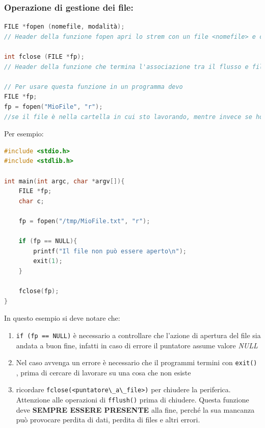 \documentclass[
  paper=a4,
  oneside  ,captions=tableheading
]{scrbook}
\newcommand{\passthrough}[1]{#1}
\begin{document}
\hypertarget{operazione-di-gestione-dei-file}{%
\subsubsection{Operazione di gestione dei
file:}\label{operazione-di-gestione-dei-file}}

\begin{lstlisting}[language=C]
FILE *fopen (nomefile, modalità);
// Header della funzione fopen apri lo strem con un file <nomefile> e con modalità (vedi dopo)

int fclose (FILE *fp);
// Header della funzione che termina l'associazione tra il flusso e file di una periferica

// Per usare questa funzione in un programma devo
FILE *fp;
fp = fopen("MioFile", "r"); 
//se il file è nella cartella in cui sto lavorando, mentre invece se ho bisogno di un file in un altra posizione devo selezionare tutto il percorso del file
\end{lstlisting}

Per esempio:

\begin{lstlisting}[language=C]
#include <stdio.h>
#include <stdlib.h>

int main(int argc, char *argv[]){
    FILE *fp;
    char c;
    
    fp = fopen("/tmp/MioFile.txt", "r");
    
    if (fp == NULL){
        printf("Il file non può essere aperto\n");
        exit(1);
    }
    
    fclose(fp);
}
\end{lstlisting}

In questo esempio si deve notare che:

\begin{enumerate}
\def\labelenumi{\arabic{enumi}.}
\item
  \passthrough{\lstinline!if (fp == NULL)!} è necessario a controllare
  che l'azione di apertura del file sia andata a buon fine, infatti in
  caso di errore il puntatore assume valore \emph{NULL}
\item
  Nel caso avvenga un errore è necessario che il programmi termini con
  \passthrough{\lstinline!exit()!} , prima di cercare di lavorare su una
  cosa che non esiste
\item
  ricordare \passthrough{\lstinline!fclose(<puntatore\_a\_file>)!} per
  chiudere la periferica. Attenzione alle operazioni di
  \passthrough{\lstinline!fflush()!} prima di chiudere. Questa funzione
  deve \textbf{SEMPRE ESSERE PRESENTE} alla fine, perché la sua mancanza
  può provocare perdita di dati, perdita di files e altri errori.
\end{enumerate}
\end{document}
